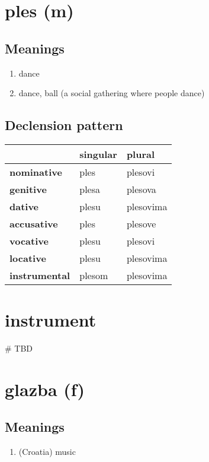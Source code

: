 \filbreak
\section{ples (m)}
\subsection*{Meanings}
\begin{enumerate}
\item dance
\item dance, ball (a social gathering where people dance)
\end{enumerate}
\subsection*{Declension pattern}
\begin{tabularx}{\linewidth}{Xll}
\toprule
{} & singular &     plural \\
\midrule
\textbf{nominative  } &     ples &    plesovi \\
\textbf{genitive    } &    plesa &    plesova \\
\textbf{dative      } &    plesu &  plesovima \\
\textbf{accusative  } &     ples &    plesove \\
\textbf{vocative    } &    plesu &    plesovi \\
\textbf{locative    } &    plesu &  plesovima \\
\textbf{instrumental} &   plesom &  plesovima \\
\bottomrule
\end{tabularx}

\filbreak
\section{instrument}
{\# TBD}
\section{glazba (f)}
\subsection*{Meanings}
\begin{enumerate}
\item (Croatia) music
\end{enumerate}

